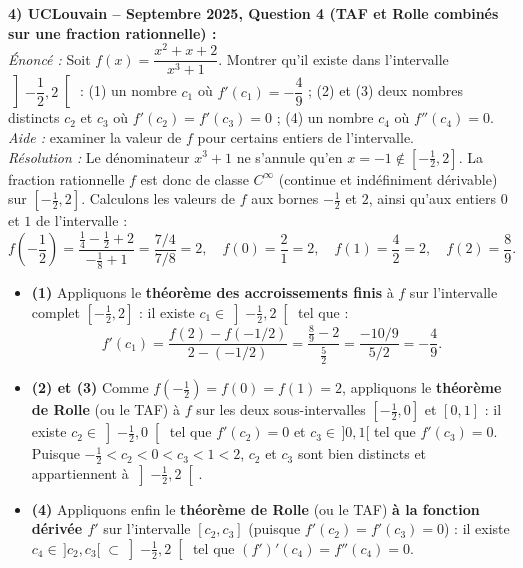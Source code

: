 \begin{exemple}
\medskip
\textbf{4) UCLouvain -- Septembre 2025, Question 4 (TAF et Rolle combinés sur une fraction rationnelle) :}\\
\emph{Énoncé :} Soit $f(x) = \dfrac{x^2 + x + 2}{x^3 + 1}$. Montrer qu'il existe dans l'intervalle $\left]-\dfrac{1}{2}, 2\right[$ :
(1) un nombre $c_1$ où $f'(c_1) = -\dfrac{4}{9}$ ;
(2) et (3) deux nombres distincts $c_2$ et $c_3$ où $f'(c_2) = f'(c_3) = 0$ ;
(4) un nombre $c_4$ où $f''(c_4) = 0$.
\emph{Aide :} examiner la valeur de $f$ pour certains entiers de l'intervalle.\\
\emph{Résolution :} Le dénominateur $x^3 + 1$ ne s'annule qu'en $x = -1 \notin \left[-\frac{1}{2}, 2\right]$. La fraction rationnelle $f$ est donc de classe $C^\infty$ (continue et indéfiniment dérivable) sur $\left[-\frac{1}{2}, 2\right]$. Calculons les valeurs de $f$ aux bornes $-\frac{1}{2}$ et $2$, ainsi qu'aux entiers $0$ et $1$ de l'intervalle :
\[
    f\left(-\frac{1}{2}\right) = \frac{\frac{1}{4} - \frac{1}{2} + 2}{-\frac{1}{8} + 1} = \frac{7/4}{7/8} = 2, \quad f(0) = \frac{2}{1} = 2, \quad f(1) = \frac{4}{2} = 2, \quad f(2) = \frac{8}{9}.
\]
\begin{itemize}
    \item \textbf{(1)} Appliquons le \textbf{théorème des accroissements finis} à $f$ sur l'intervalle complet $\left[-\frac{1}{2}, 2\right]$ : il existe $c_1 \in \left]-\frac{1}{2}, 2\right[$ tel que :
    \[
        f'(c_1) = \frac{f(2) - f(-1/2)}{2 - (-1/2)} = \frac{\frac{8}{9} - 2}{\frac{5}{2}} = \frac{-10/9}{5/2} = -\frac{4}{9}.
    \]
    \item \textbf{(2) et (3)} Comme $f\left(-\frac{1}{2}\right) = f(0) = f(1) = 2$, appliquons le \textbf{théorème de Rolle} (ou le TAF) à $f$ sur les deux sous-intervalles $\left[-\frac{1}{2}, 0\right]$ et $[0, 1]$ : il existe $c_2 \in \left]-\frac{1}{2}, 0\right[$ tel que $f'(c_2) = 0$ et $c_3 \in \,]0, 1[$ tel que $f'(c_3) = 0$. Puisque $-\frac{1}{2} < c_2 < 0 < c_3 < 1 < 2$, $c_2$ et $c_3$ sont bien distincts et appartiennent à $\left]-\frac{1}{2}, 2\right[$.
    \item \textbf{(4)} Appliquons enfin le \textbf{théorème de Rolle} (ou le TAF) \textbf{à la fonction dérivée $f'$} sur l'intervalle $[c_2, c_3]$ (puisque $f'(c_2) = f'(c_3) = 0$) : il existe $c_4 \in \,]c_2, c_3[ \;\subset \left]-\frac{1}{2}, 2\right[$ tel que $(f')'(c_4) = f''(c_4) = 0$.
\end{itemize}
\end{exemple}


